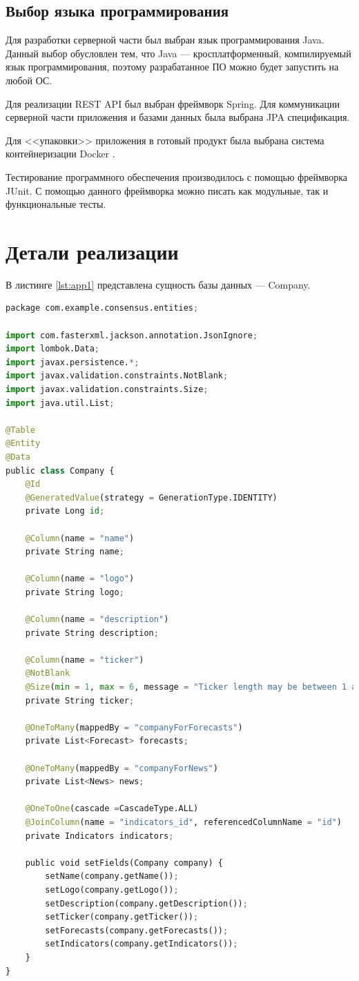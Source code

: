 \subsection{Выбор языка программирования}
Для разработки серверной части был выбран язык программирования Java. Данный выбор обусловлен тем, что Java --- кросплатформенный, компилируемый язык программирования, поэтому разрабатанное ПО можно будет запустить на любой ОС.  

Для реализации REST API был выбран фреймворк Spring. Для коммуникации  серверной части приложения и базами данных была выбрана JPA спецификация.   

Для <<упаковки>> приложения в готовый продукт была выбрана система контейнеризации Docker \cite{bib:8}.  

Тестирование программного обеспечения производилось с помощью фреймворка JUnit. С помощью данного фреймворка можно писать как модульные, так и функциональные тесты.  


\section{Детали реализации}

В листинге \ref{lst:app1} представлена сущность базы данных --- Company.

\begin{lstlisting}[label=lst:app1, caption=Сущность Company, language=python]
package com.example.consensus.entities;

import com.fasterxml.jackson.annotation.JsonIgnore;
import lombok.Data;
import javax.persistence.*;
import javax.validation.constraints.NotBlank;
import javax.validation.constraints.Size;
import java.util.List;

@Table
@Entity
@Data
public class Company {
	@Id
	@GeneratedValue(strategy = GenerationType.IDENTITY)
	private Long id;

	@Column(name = "name")
	private String name;

	@Column(name = "logo")
	private String logo;

	@Column(name = "description")
	private String description;

	@Column(name = "ticker")
	@NotBlank
	@Size(min = 1, max = 6, message = "Ticker length may be between 1 and 6")
	private String ticker;

	@OneToMany(mappedBy = "companyForForecasts")
	private List<Forecast> forecasts;

	@OneToMany(mappedBy = "companyForNews")
	private List<News> news;

	@OneToOne(cascade =CascadeType.ALL)
	@JoinColumn(name = "indicators_id", referencedColumnName = "id")
	private Indicators indicators;

	public void setFields(Company company) {
		setName(company.getName());
		setLogo(company.getLogo());
		setDescription(company.getDescription());
		setTicker(company.getTicker());
		setForecasts(company.getForecasts());
		setIndicators(company.getIndicators());
	}
}	
\end{lstlisting}
\newpage

